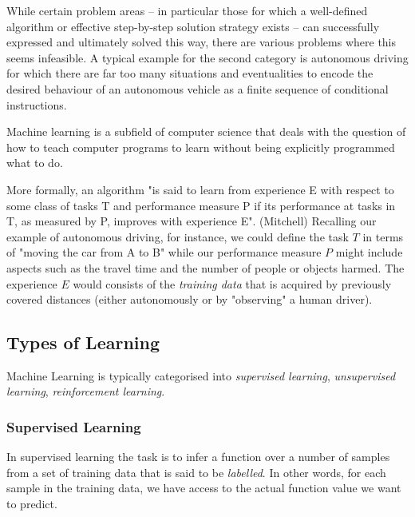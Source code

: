 While certain problem areas -- in particular those for which a well-defined algorithm or effective step-by-step solution strategy exists -- can successfully expressed and ultimately solved this way, there are various problems where this seems infeasible. A typical example for the second category is autonomous driving for which there are far too many situations and eventualities to encode the desired behaviour of an autonomous vehicle as a finite sequence of conditional instructions. 

Machine learning is a subfield of computer science that deals with the question of how to teach computer programs to learn without being explicitly programmed what to do. 

More formally, an algorithm "is said to learn from experience E with respect to some class of tasks T and performance measure P if its performance at tasks in T, as measured by P, improves with experience E". (Mitchell)
Recalling our example of autonomous driving, for instance, we could define the task $T$ in terms of "moving the car from A to B" while our performance measure $P$ might include aspects such as the travel time and the number of people or objects harmed. The experience $E$ would consists of the \emph{training data} that is acquired by previously covered distances (either autonomously or by "observing" a human driver). 


\subsection{Types of Learning}
Machine Learning is typically categorised into \emph{supervised learning}, \emph{unsupervised learning}, \emph{reinforcement learning}. 


\subsubsection{Supervised Learning} 
In supervised learning the task is to infer a function over a number of samples from a set of training data that is said to be \emph{labelled}. In other words, for each sample in the training data, we have access to the actual function value we want to predict. 

